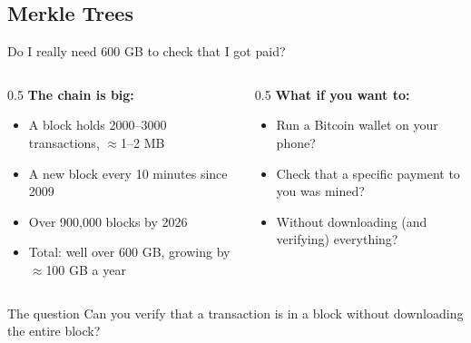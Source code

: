 \ifdefined\PRESENTATION\else\PassOptionsToClass{handout}{beamer}\fi\documentclass[aspectratio=169, lualatex]{beamer}
\begin{document}
\subsection{Merkle Trees}

\begin{frame}{Do I really need 600 GB to check that I got paid?}
	\begin{columns}[c]
		\begin{column}{0.5\textwidth}
			\textbf{The chain is big:}
			\begin{itemize}
				\item A block holds 2000--3000 transactions, $\approx$1--2 MB
				\item A new block every 10 minutes since 2009
				\item Over 900,000 blocks by 2026
				\item Total: well over 600 GB, growing by $\approx$100 GB a year
			\end{itemize}
		\end{column}
		\begin{column}{0.5\textwidth}
			\textbf{What if you want to:}
			\begin{itemize}
				\item Run a Bitcoin wallet on your phone?
				\item Check that a specific payment to you was mined?
				\item Without downloading (and verifying) everything?
			\end{itemize}
		\end{column}
	\end{columns}
	\begin{alertblock}{The question}
		Can you verify that a transaction is in a block without downloading the entire block?
	\end{alertblock}
\end{frame}
\end{document}
